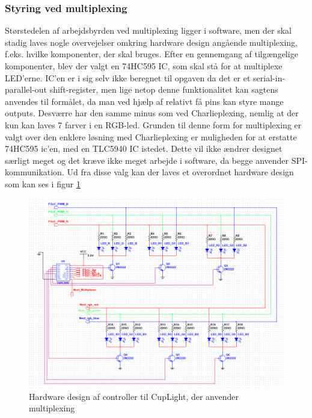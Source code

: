 \documentclass[HardwareDesign/HardwareDesign_main.tex]{subfiles}
\begin{document}
\subsubsection{Styring ved multiplexing}
Størstedelen af arbejdsbyrden ved multiplexing ligger i software, men der skal stadig laves nogle overvejelser omkring hardware design angående multiplexing, f.eks. hvilke komponenter, der skal bruges. Efter en gennemgang af tilgængelige komponenter, blev der valgt en 74HC595 IC, som skal stå for at multiplexe LED'erne. IC'en er i sig selv ikke beregnet til opgaven da det er et serial-in-parallel-out shift-register, men lige netop denne funktionalitet kan sagtens anvendes til formålet, da man ved hjælp af relativt få pins kan styre mange outputs. Desværre har den samme minus som ved Charlieplexing, nemlig at der kun kan laves 7 farver i en RGB-led. Grunden til denne form for multiplexing er valgt over den enklere løsning med Charlieplexing er muligheden for at erstatte 74HC595 ic'en, med en TLC5940 IC istedet. Dette vil ikke ændrer designet særligt meget og det kræve ikke meget arbejde i software, da begge anvender SPI-kommunikation. Ud fra disse valg kan der laves et overordnet hardware design som kan ses i figur \ref{fig:CupLight_HW_Multiplexing}
\begin{figure}[H]
    \centering
    \includegraphics[width=\textwidth]{HardwareDesign/CupLight/graphics/CupLight.png}
    \caption{Hardware design af controller til CupLight, der anvender multiplexing}
    \label{fig:CupLight_HW_Multiplexing}
\end{figure}
\end{document}
